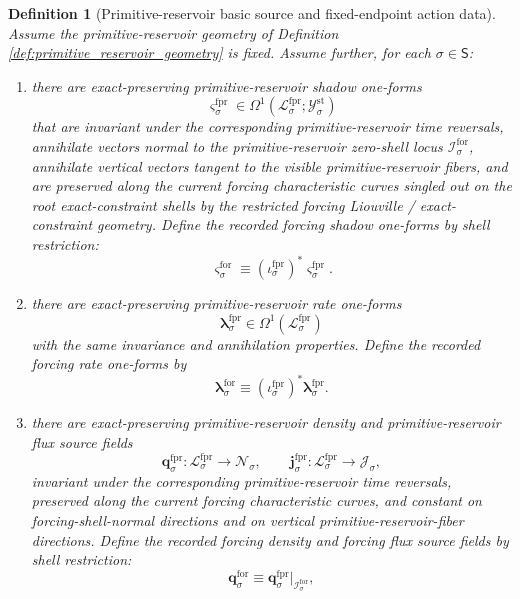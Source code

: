 \documentclass[11pt]{article}
\newcommand{\SectorSet}{\mathsf S}
\newcommand{\StatTagClass}[1]{\mathcal Y_{#1}^{\mathrm{st}}}
\newcommand{\DensityClass}[1]{\mathscr N_{#1}}
\newcommand{\FluxClass}[1]{\mathscr J_{#1}}
\newcommand{\ForSpace}[1]{\mathcal I_{#1}^{\mathrm{for}}}
\newcommand{\ForShadowForm}[1]{\boldsymbol{\varsigma}_{#1}^{\mathrm{for}}}
\newcommand{\ForRateForm}[1]{\boldsymbol{\lambda}_{#1}^{\mathrm{for}}}
\newcommand{\ForDensitySource}[1]{\boldsymbol{q}_{#1}^{\mathrm{for}}}
\newcommand{\ForPrimSpace}[1]{\mathcal L_{#1}^{\mathrm{fpr}}}
\newcommand{\ForPrimInc}[1]{\iota_{#1}^{\mathrm{fpr}}}
\newcommand{\ForPrimShadowForm}[1]{\boldsymbol{\varsigma}_{#1}^{\mathrm{fpr}}}
\newcommand{\ForPrimRateForm}[1]{\boldsymbol{\lambda}_{#1}^{\mathrm{fpr}}}
\newcommand{\ForPrimDensitySource}[1]{\boldsymbol{q}_{#1}^{\mathrm{fpr}}}
\newcommand{\ForPrimFluxSource}[1]{\boldsymbol{j}_{#1}^{\mathrm{fpr}}}
\newtheorem{definition}{Definition}
\begin{document}
\begin{definition}[Primitive-reservoir basic source and fixed-endpoint action data]
\label{def:primitive_reservoir_basic}
Assume the primitive-reservoir geometry of Definition \ref{def:primitive_reservoir_geometry} is fixed. Assume further, for each \(\sigma\in\SectorSet\):
\begin{enumerate}
    \item there are exact-preserving primitive-reservoir shadow one-forms
    \[
    \ForPrimShadowForm{\sigma}\in\Omega^1(\ForPrimSpace{\sigma};\StatTagClass{\sigma})
    \]
    that are invariant under the corresponding primitive-reservoir time reversals, annihilate vectors normal to the primitive-reservoir zero-shell locus \(\ForSpace{\sigma}\), annihilate vertical vectors tangent to the visible primitive-reservoir fibers, and are preserved along the current forcing characteristic curves singled out on the root exact-constraint shells by the restricted forcing Liouville / exact-constraint geometry. Define the recorded forcing shadow one-forms by shell restriction:
    \begin{equation}
    \ForShadowForm{\sigma}\equiv (\ForPrimInc{\sigma})^*\ForPrimShadowForm{\sigma}.
    \label{eq:forcing_shadow_from_reservoir}
    \end{equation}
    \item there are exact-preserving primitive-reservoir rate one-forms
    \[
    \ForPrimRateForm{\sigma}\in\Omega^1(\ForPrimSpace{\sigma})
    \]
    with the same invariance and annihilation properties. Define the recorded forcing rate one-forms by
    \begin{equation}
    \ForRateForm{\sigma}\equiv (\ForPrimInc{\sigma})^*\ForPrimRateForm{\sigma}.
    \label{eq:forcing_rate_from_reservoir}
    \end{equation}
    \item there are exact-preserving primitive-reservoir density and primitive-reservoir flux source fields
    \[
    \ForPrimDensitySource{\sigma}:\ForPrimSpace{\sigma}\to\DensityClass{\sigma},
    \qquad
    \ForPrimFluxSource{\sigma}:\ForPrimSpace{\sigma}\to\FluxClass{\sigma},
    \]
    invariant under the corresponding primitive-reservoir time reversals, preserved along the current forcing characteristic curves, and constant on forcing-shell-normal directions and on vertical primitive-reservoir-fiber directions. Define the recorded forcing density and forcing flux source fields by shell restriction:
    \begin{equation}
    \ForDensitySource{\sigma}\equiv \ForPrimDensitySource{\sigma}|_{\ForSpace{\sigma}},

\end{equation}
\end{enumerate}
\end{definition}
\end{document}
